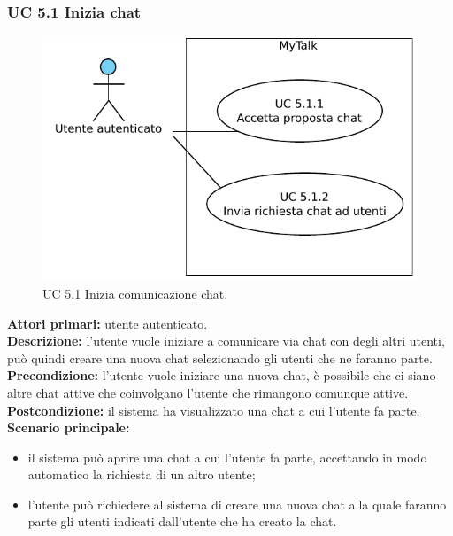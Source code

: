 \newpage

\subsubsection{UC 5.1 Inizia chat}

\begin{figure}[htbp]
\centering
\includegraphics[scale=0.7]{./casi_uso/UC5-1.pdf}
\caption{UC 5.1 Inizia comunicazione chat.}
\end{figure}

\noindent
\textbf{Attori primari:} utente autenticato.\\
\textbf{Descrizione:} l'utente vuole iniziare a comunicare via chat con degli altri utenti, può quindi creare una nuova chat selezionando gli utenti che ne faranno parte.\\
\textbf{Precondizione:} l'utente vuole iniziare una nuova chat, è possibile che ci siano altre chat attive che coinvolgano l'utente che rimangono comunque attive.\\
\textbf{Postcondizione:} il sistema ha visualizzato una chat a cui l'utente fa parte.\\
\textbf{Scenario principale:}
\begin{itemize}
\item il sistema può aprire una chat a cui l'utente fa parte, accettando in modo automatico la richiesta di un altro utente;
\item l'utente può richiedere al sistema di creare una nuova chat alla quale faranno parte gli utenti indicati dall'utente che ha creato la chat.
\end{itemize}

